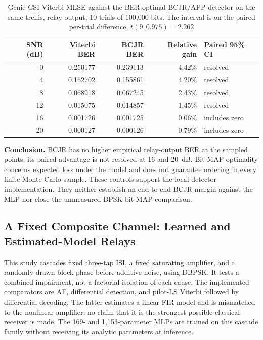 \begin{table}[htbp]
\centering
\caption[BER-optimal benchmark against Viterbi MLSE]{Genie-CSI Viterbi MLSE against the BER-optimal BCJR/APP detector on the same trellis, relay output, 10 trials of 100{,}000 bits. The interval is on the paired per-trial difference, $t(9,0.975)=2.262$}\label{tbl:bcjr-benchmark}
\begin{tabular}{rrrrl}
\toprule
SNR (dB) & Viterbi BER & BCJR BER & Relative gain & Paired 95\% CI \\
\midrule
0  & 0.250177 & 0.239113 & 4.42\% & resolved \\
4  & 0.162702 & 0.155861 & 4.20\% & resolved \\
8  & 0.068918 & 0.067245 & 2.43\% & resolved \\
12 & 0.015075 & 0.014857 & 1.45\% & resolved \\
16 & 0.001726 & 0.001725 & 0.06\% & includes zero \\
20 & 0.000127 & 0.000126 & 0.79\% & includes zero \\
\bottomrule
\end{tabular}
\end{table}

\textbf{Conclusion.} BCJR has no higher empirical relay-output BER at the sampled points; its paired advantage is not resolved at 16 and 20~dB. Bit-MAP optimality concerns expected loss under the model and does not guarantee ordering in every finite Monte Carlo sample. These controls support the local detector implementation. They neither establish an end-to-end BCJR margin against the MLP nor close the unmeasured BPSK bit-MAP comparison.

\subsection{A Fixed Composite Channel: Learned and Estimated-Model Relays}\label{sec:composite-channel}

This study cascades fixed three-tap ISI, a fixed saturating amplifier, and a randomly drawn block phase before additive noise, using DBPSK. It tests a combined impairment, not a factorial isolation of each cause. The implemented comparators are AF, differential detection, and pilot-LS Viterbi followed by differential decoding. The latter estimates a linear FIR model and is mismatched to the nonlinear amplifier; no claim that it is the strongest possible classical receiver is made. The 169- and 1{,}153-parameter MLPs are trained on this cascade family without receiving its analytic parameters at inference.

